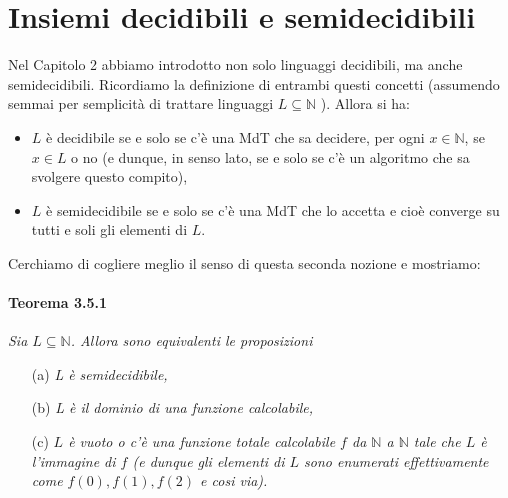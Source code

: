 \section{Insiemi decidibili e semidecidibili}

Nel Capitolo 2 abbiamo introdotto non solo linguaggi
decidibili, ma anche semidecidibili. Ricordiamo la definizione di entrambi
questi concetti (assumendo semmai per semplicità di trattare linguaggi $L
    \subseteq \mathbb{N}$ ). Allora si ha:

\begin{itemize}
    \item $L$ è decidibile se e solo se c'è una MdT che sa decidere, per ogni
          $x \in \mathbb{N}$, se $x \in L$ o no (e dunque, in senso lato, se e
          solo se c'è un algoritmo che sa svolgere questo compito),
    \item $L$ è semidecidibile se e solo se c'è una MdT che lo accetta e cioè
          converge su tutti e soli gli elementi di $L$.
\end{itemize}

Cerchiamo di cogliere meglio il senso di
questa seconda nozione e mostriamo:

\paragraph{Teorema 3.5.1} \textit{Sia $L \subseteq \mathbb{N}$.
    Allora sono equivalenti le proposizioni}

\begin{itemize}
    \item[(a)] \textit{L è semidecidibile,}
    \item[(b)] \textit{L è il dominio di una funzione calcolabile,}
    \item[(c)] \textit{$L$ è vuoto o c'è una funzione totale calcolabile $f$ da $\mathbb{N}$ a
            $\mathbb{N}$ tale che $L$ è l'immagine di $f$ (e dunque gli elementi
            di $L$ sono enumerati effettivamente come $f(0), f(1), f(2)$ e cosi
            via).}
\end{itemize}


